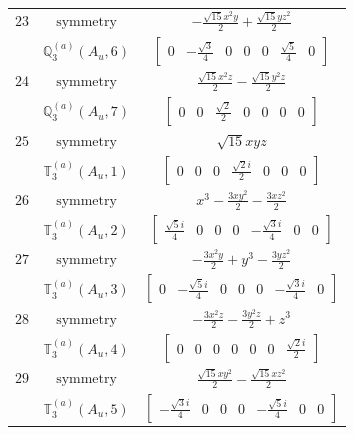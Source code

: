 \documentclass[fleqn,8pt,landscape]{jsarticle}
\begin{document}
\begin{longtable}{ccc}
$ 23 $ & $ \text{symmetry} $ & $ - \frac{\sqrt{15} x^{2} y}{2} + \frac{\sqrt{15} y z^{2}}{2} $ \\
$  $ & $ \mathbb{Q}_{3}^{(a)}(A_{u},6) $ & $ \begin{bmatrix} 0 & - \frac{\sqrt{3}}{4} & 0 & 0 & 0 & \frac{\sqrt{5}}{4} & 0 \end{bmatrix} $ \\ \hline
$ 24 $ & $ \text{symmetry} $ & $ \frac{\sqrt{15} x^{2} z}{2} - \frac{\sqrt{15} y^{2} z}{2} $ \\
$  $ & $ \mathbb{Q}_{3}^{(a)}(A_{u},7) $ & $ \begin{bmatrix} 0 & 0 & \frac{\sqrt{2}}{2} & 0 & 0 & 0 & 0 \end{bmatrix} $ \\ \hline
$ 25 $ & $ \text{symmetry} $ & $ \sqrt{15} x y z $ \\
$  $ & $ \mathbb{T}_{3}^{(a)}(A_{u},1) $ & $ \begin{bmatrix} 0 & 0 & 0 & \frac{\sqrt{2} i}{2} & 0 & 0 & 0 \end{bmatrix} $ \\ \hline
$ 26 $ & $ \text{symmetry} $ & $ x^{3} - \frac{3 x y^{2}}{2} - \frac{3 x z^{2}}{2} $ \\
$  $ & $ \mathbb{T}_{3}^{(a)}(A_{u},2) $ & $ \begin{bmatrix} \frac{\sqrt{5} i}{4} & 0 & 0 & 0 & - \frac{\sqrt{3} i}{4} & 0 & 0 \end{bmatrix} $ \\ \hline
$ 27 $ & $ \text{symmetry} $ & $ - \frac{3 x^{2} y}{2} + y^{3} - \frac{3 y z^{2}}{2} $ \\
$  $ & $ \mathbb{T}_{3}^{(a)}(A_{u},3) $ & $ \begin{bmatrix} 0 & - \frac{\sqrt{5} i}{4} & 0 & 0 & 0 & - \frac{\sqrt{3} i}{4} & 0 \end{bmatrix} $ \\ \hline
$ 28 $ & $ \text{symmetry} $ & $ - \frac{3 x^{2} z}{2} - \frac{3 y^{2} z}{2} + z^{3} $ \\
$  $ & $ \mathbb{T}_{3}^{(a)}(A_{u},4) $ & $ \begin{bmatrix} 0 & 0 & 0 & 0 & 0 & 0 & \frac{\sqrt{2} i}{2} \end{bmatrix} $ \\ \hline
$ 29 $ & $ \text{symmetry} $ & $ \frac{\sqrt{15} x y^{2}}{2} - \frac{\sqrt{15} x z^{2}}{2} $ \\
$  $ & $ \mathbb{T}_{3}^{(a)}(A_{u},5) $ & $ \begin{bmatrix} - \frac{\sqrt{3} i}{4} & 0 & 0 & 0 & - \frac{\sqrt{5} i}{4} & 0 & 0 \end{bmatrix} $ \\ \hline

\end{longtable}
\end{document}
